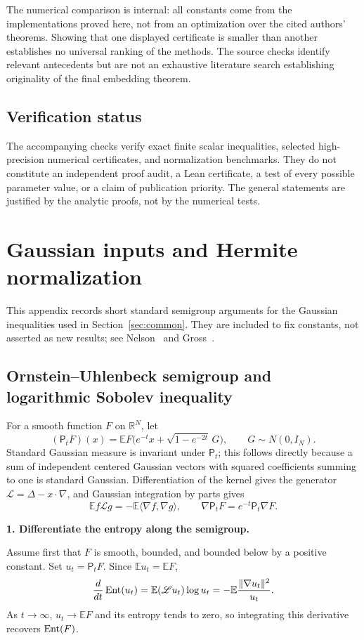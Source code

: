 \documentclass[11pt]{article}
\numberwithin{equation}{section}
\theoremstyle{definition}\newtheorem{definition}[theorem]{Definition}
\theoremstyle{remark}\newtheorem{remark}[theorem]{Remark}
\newcommand{\R}{\mathbb R}\newcommand{\E}{\mathbb E}\newcommand{\Prob}{\mathbb P}
\newcommand{\norm}[1]{\lVert#1\rVert}\newcommand{\ip}[2]{\langle#1,#2\rangle}
\newcommand{\step}[1]{\par\addvspace{.65\baselineskip}\Needspace{4\baselineskip}\noindent\textbf{#1}\par\nobreak\smallskip}
\begin{document}
The numerical comparison is internal: all constants come from the implementations
proved here, not from an optimization over the cited authors' theorems. Showing
that one displayed certificate is smaller than another establishes no universal
ranking of the methods. The source checks identify relevant antecedents but are
not an exhaustive literature search establishing originality of the final
embedding theorem.

\subsection{Verification status}

The accompanying checks verify exact finite scalar inequalities, selected
high-precision numerical certificates, and normalization benchmarks. They do not
constitute an independent proof audit, a Lean certificate, a test of every
possible parameter value, or a claim of publication priority. The general
statements are justified by the analytic proofs, not by the numerical tests.


\clearpage
\appendix
\section{Gaussian inputs and Hermite normalization}\label{app:gaussian}
This appendix records short standard semigroup arguments for the Gaussian
inequalities used in Section~\ref{sec:common}. They are included to fix constants,
not asserted as new results; see Nelson~\cite{Nelson} and
Gross~\cite{Gross,GrossSurvey}.

\subsection{Ornstein--Uhlenbeck semigroup and logarithmic Sobolev inequality}
For a smooth function $F$ on $\R^N$, let
\[
 (\mathsf P_tF)(x)=\E F\bigl(e^{-t}x+\sqrt{1-e^{-2t}}\,G\bigr),
 \qquad G\sim N(0,I_N).
\]
Standard Gaussian measure is invariant under $\mathsf P_t$; this follows directly
because a sum of independent centered Gaussian vectors with squared coefficients
summing to one is standard Gaussian. Differentiation of the kernel gives the
generator $\mathscr L=\Delta-x\cdot\nabla$, and Gaussian integration by parts gives
\[
 \E f\mathscr Lg=-\E\ip{\nabla f}{\nabla g},\qquad
 \nabla\mathsf P_tF=e^{-t}\mathsf P_t\nabla F.
\]

\step{1. Differentiate the entropy along the semigroup.}
Assume first that $F$ is smooth, bounded, and bounded below by a positive constant.
Set $u_t=\mathsf P_tF$. Since $\E u_t=\E F$,
\[
 \frac{d}{dt}\Ent(u_t)
 =\E(\mathscr Lu_t)\log u_t
 =-\E\frac{\norm{\nabla u_t}^2}{u_t}.
\]
As $t\to\infty$, $u_t\to\E F$ and its entropy tends to zero, so integrating this
derivative recovers $\operatorname{Ent}(F)$.
\end{document}
